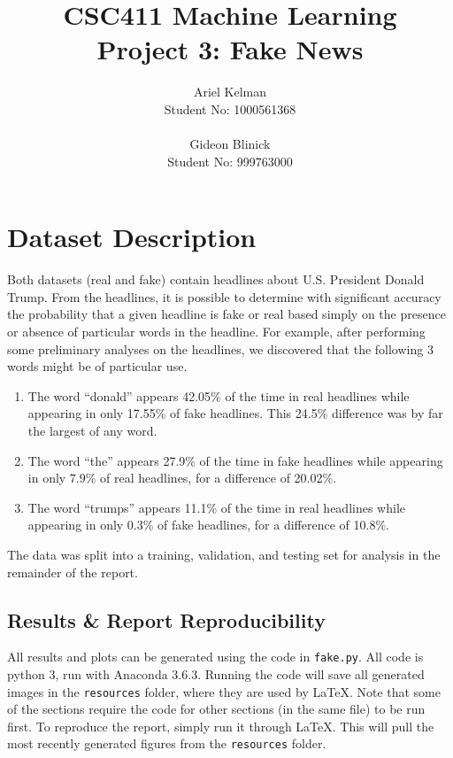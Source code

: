\documentclass{article}
\title{CSC411 Machine Learning \\ Project 3: Fake News}
\author{ Ariel Kelman \\ Student No: 1000561368
         \\ \\
         Gideon Blinick \\ Student No: 999763000 }
\begin{document}
   \maketitle{}


   \section{Dataset Description}

   Both datasets (real and fake) contain headlines about U.S. President Donald Trump.
   From the headlines, it is possible to determine with significant accuracy
   the probability that a given headline is fake or real based simply on the presence or
   absence of particular words in the headline. For example, after performing some preliminary
   analyses on the headlines, we discovered that the following 3 words might be of particular use.
   \begin{enumerate}
      \item The word ``donald'' appears 42.05\% of the time in real headlines while appearing in only
            17.55\% of fake headlines. This 24.5\% difference was by far the largest of any word.
      \item The word ``the'' appears 27.9\% of the time in fake headlines while appearing in only
            7.9\% of real headlines, for a difference of 20.02\%.
      \item The word ``trumps'' appears 11.1\% of the time in real headlines while appearing in
            only 0.3\% of fake headlines, for a difference of 10.8\%.
   \end{enumerate}

   The data was split into a training, validation, and testing set for analysis in the remainder
   of the report.


   \subsection{Results \& Report Reproducibility}
   All results and plots can be generated using the code in \texttt{fake.py}.
   All code is python 3, run with Anaconda 3.6.3.
   Running the code will save all generated images in the \texttt{resources} folder,
   where they are used by \LaTeX. Note that some of the sections require the code for
   other sections (in the same file) to be run first.
   To reproduce the report, simply run it through \LaTeX. This will pull the most recently
   generated figures from the \texttt{resources} folder.
\end{document}
